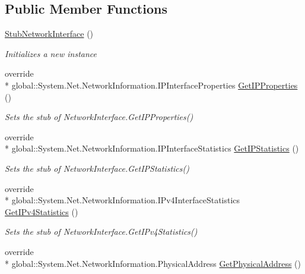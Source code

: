 \subsection*{Public Member Functions}
\begin{DoxyCompactItemize}
\item 
\hyperlink{class_system_1_1_net_1_1_network_information_1_1_fakes_1_1_stub_network_interface_a0fccf4df3eb620357a4dc4c34fced611}{Stub\-Network\-Interface} ()
\begin{DoxyCompactList}\small\item\em Initializes a new instance\end{DoxyCompactList}\item 
override \\*
global\-::\-System.\-Net.\-Network\-Information.\-I\-P\-Interface\-Properties \hyperlink{class_system_1_1_net_1_1_network_information_1_1_fakes_1_1_stub_network_interface_a61c9570017fcb722406cc5e86ffdf210}{Get\-I\-P\-Properties} ()
\begin{DoxyCompactList}\small\item\em Sets the stub of Network\-Interface.\-Get\-I\-P\-Properties()\end{DoxyCompactList}\item 
override \\*
global\-::\-System.\-Net.\-Network\-Information.\-I\-P\-Interface\-Statistics \hyperlink{class_system_1_1_net_1_1_network_information_1_1_fakes_1_1_stub_network_interface_a36f99ed94c8b3de8ac66d41f1b697651}{Get\-I\-P\-Statistics} ()
\begin{DoxyCompactList}\small\item\em Sets the stub of Network\-Interface.\-Get\-I\-P\-Statistics()\end{DoxyCompactList}\item 
override \\*
global\-::\-System.\-Net.\-Network\-Information.\-I\-Pv4\-Interface\-Statistics \hyperlink{class_system_1_1_net_1_1_network_information_1_1_fakes_1_1_stub_network_interface_a6c664987ce6ce377946fe7ee4eb74f41}{Get\-I\-Pv4\-Statistics} ()
\begin{DoxyCompactList}\small\item\em Sets the stub of Network\-Interface.\-Get\-I\-Pv4\-Statistics()\end{DoxyCompactList}\item 
override \\*
global\-::\-System.\-Net.\-Network\-Information.\-Physical\-Address \hyperlink{class_system_1_1_net_1_1_network_information_1_1_fakes_1_1_stub_network_interface_ad1a27ddd80ac381de80b9258ef7e136e}{Get\-Physical\-Address} ()

\end{DoxyCompactItemize}
